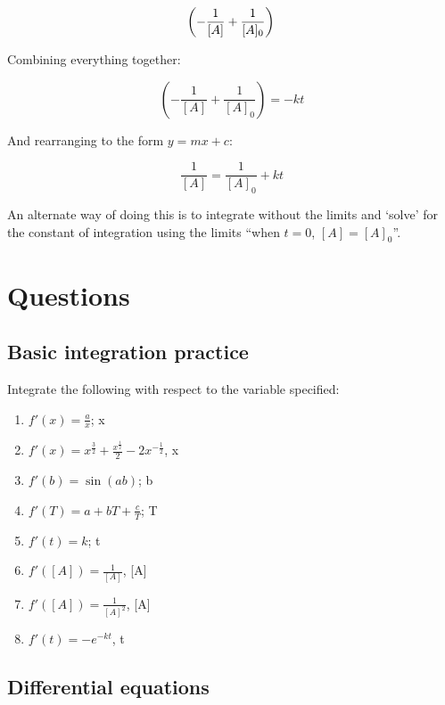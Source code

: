 \documentclass[
]{book}
\providecommand{\tightlist}{%
  \setlength{\itemsep}{0pt}\setlength{\parskip}{0pt}}
\begin{document}
\begin{equation*}
\left(-\frac{1}{[A]}+\frac{1}{[A]_0} \right)\\
\end{equation*}

Combining everything together:

\begin{equation*}
\left(-\frac{1}{[A]}+\frac{1}{[A]_0} \right) = -kt
\end{equation*}

And rearranging to the form \(y = mx + c\):

\begin{equation*}
\frac{1}{[A]}=\frac{1}{[A]_0} + kt
\end{equation*}

An alternate way of doing this is to integrate without the limits and `solve' for the constant of integration using the limits ``when \(t = 0\), \([A] = [A]_0\)''.

\hypertarget{sec:Questions6}{%
\section{Questions}\label{sec:Questions6}}

\hypertarget{basic-integration-practice}{%
\subsection{Basic integration practice}\label{basic-integration-practice}}

Integrate the following with respect to the variable specified:

\begin{enumerate}
\def\labelenumi{\arabic{enumi}.}
\tightlist
\item
  \(f'(x) = \frac{a}{x}\); x
\item
  \(f'(x) = x^\frac{3}{2}+ \frac{x^\frac{1}{2}}{2} - 2x^{-\frac{1}{2}}\), x
\item
  \(f'(b) = \sin (ab)\); b
\item
  \(f'(T) = a + bT + \frac{c}{T}\); T
\item
  \(f'(t) = k\); t
\item
  \(f'([A]) = \frac{1}{[A]}\), {[}A{]}
\item
  \(f'([A]) = \frac{1}{[A]^2}\), {[}A{]}
\item
  \(f'(t) = -e^{-kt}\), t
\end{enumerate}

\hypertarget{differential-equations}{%
\subsection{Differential equations}\label{differential-equations}}
\end{document}
